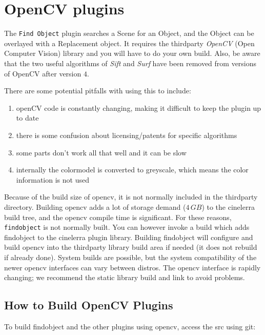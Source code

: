 \section{OpenCV plugins}%
\label{sec:opencv_plugins}

The \texttt{Find Object} plugin searches a Scene for an Object, and the Object can be overlayed with a Replacement object. It requires the thirdparty \textit{OpenCV} (Open Computer Vision) library and you will have to do your own build. Also, be aware that the two useful algorithms of \textit{Sift} and \textit{Surf} have been removed from versions of OpenCV after version $4$.

There are some potential pitfalls with using this to include:

\begin{enumerate}
    \item openCV code is constantly changing, making it difficult to keep the plugin up to date
    \item there is some confusion about licensing/patents for specific algorithms
    \item some parts don’t work all that well and it can be slow
    \item internally the colormodel is converted to greyscale, which means the color information is not used
\end{enumerate}

Because of the build size of opencv, it is not normally included in the thirdparty directory. Building opencv adds a lot of storage demand ($4\,GB$) to the cinelerra build tree, and the opencv compile time is significant. For these reasons, \texttt{findobject} is not normally built. You can however invoke a build which adds findobject to the cinelerra plugin library. Building findobject will configure and build opencv into the thirdparty library build area if needed (it does not rebuild if already done). System builds are possible, but the system compatibility of the newer opencv interfaces can vary between distros. The opencv interface is rapidly changing; we recommend the static library build and link to avoid problems.

\subsection{How to Build OpenCV Plugins}%
\label{sub:how_build_opencv_plugins}

To build findobject and the other plugins using opencv, access the src using git:

